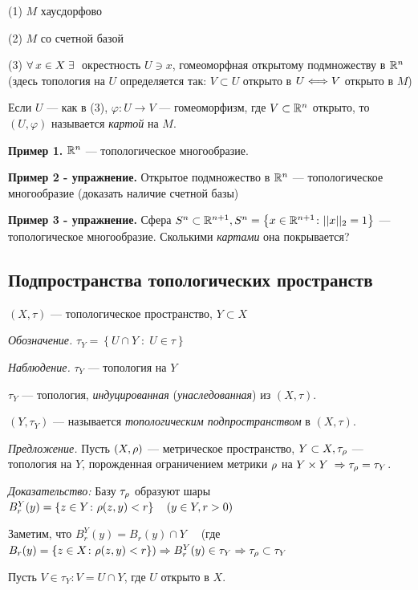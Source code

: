 \documentclass[../../main.tex]{subfiles}
\begin{document}
(1) $M$ хаусдорфово

(2) $M$ со счетной базой

(3) $\forall\: x \in X \; \exists\: $ окрестность $U \ni x$, гомеоморфная открытому подмножеству в $\mathbb{R}^n$ (здесь топология на $U$ определяется так: $V \subset U$ открыто в $U \Longleftrightarrow V$ открыто в $M$)

Если $U$ — как в (3), $\varphi \colon U \to V$ — гомеоморфизм, где $V \subset \mathbb{R}^n$ открыто, то $(U, \varphi)$ называется \textit{картой} на $M$.

\textbf{Пример 1.} $\mathbb{R}^n$ — топологическое многообразие.

\textbf{Пример 2 - упражнение.} Открытое подмножество в $\mathbb{R}^n$ — топологическое многообразие (доказать наличие счетной базы)

\textbf{Пример 3 - упражнение.} Сфера $S^n \subset \mathbb{R}^{n+1}, S^n = \left\{x \in \mathbb{R}^{n+1} \colon ||x||_2 = 1 \right\}$ — топологическое многообразие.
Сколькими \textit{картами} она покрывается?

\subsection{Подпространства топологических пространств}

$(X, \tau)$ — топологическое пространство, $Y \subset X$

\textit{Обозначение.} $\tau_Y = \left\{ U \cap Y\; \colon \; U \in \tau \right\}$

\textit{Наблюдение.} $\tau_Y$ — топология на $Y$

 $\tau_Y$ — топология, \textit{индуцированная} (\textit{унаследованная}) из $(X, \tau)$.

 $(Y, \tau_Y)$ — называется \textit{топологическим подпространством} в $(X, \tau)$.

\textit{Предложение.} Пусть $(X, \rho)$ — метрическое пространство, $Y \subset X, \tau_{\rho}$ — топология на $Y$, порожденная ограничением метрики $\rho$ на $Y\times Y \; \Rightarrow \tau_{\rho} = \tau_{Y}$.

\textit{Доказательство:} Базу $\tau_{\rho}$ образуют шары $B^Y_r(y) = \left\{ z \in Y \colon \rho(z,y) < r \right\} \quad \left(y \in Y, r > 0 \right)$

Заметим, что $B^Y_r(y) = B_r(y) \cap Y \quad$  (где $B_r(y) = \left\{ z \in X \colon \rho(z, y) < r \right\}) \Rightarrow B^Y_r(y) \in \tau_Y \Rightarrow \tau_{\rho} \subset \tau_Y$

Пусть $V \in \tau_{Y} \colon V = U \cap Y$, где $U$ открыто в $X$.
\end{document}
